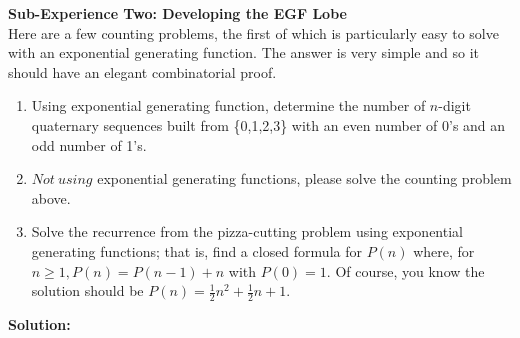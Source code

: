 \documentclass[10pt,a4paper]{report}
\begin{document}
	\textbf{Sub-Experience Two: Developing the EGF Lobe}\\
	Here are a few counting problems, the first of which is particularly easy to solve with an exponential generating function.  The answer is very simple and so it should have an elegant combinatorial proof.
	\begin{enumerate}
		\item Using exponential generating function, determine the number of $n$-digit quaternary sequences built from \{0,1,2,3\} with an even number of 0's and an odd number of 1's.
		\item $Not\ using$ exponential generating functions, please solve the counting problem above.
		\item Solve the recurrence from the pizza-cutting problem using exponential generating functions; that is, find a closed formula for $P(n)$ where, for $n\geq1, P(n) = P(n-1) + n$ with $P(0) = 1$.  Of course, you know the solution should be $P(n) = \frac{1}{2}n^2 + \frac{1}{2}n + 1$.
	\end{enumerate}
	\textbf{Solution: }\\
	\newline
\end{document}

